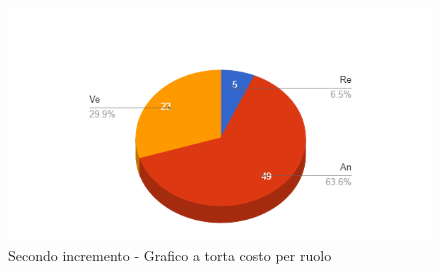 {{\begin{longtable}{C{.4\freewidth} C{.2\freewidth} C{.2\freewidth} C{.2\freewidth} C{.2\freewidth} C{.2\freewidth} C{.2\freewidth} C{.2\freewidth} C{.2\freewidth}}
        \end{longtable}
        \begin{figure}[H]
          \includegraphics[width=15cm]{sezioni/Images/secondoT.png}
          \centering
          \caption{Secondo incremento - Grafico a torta costo per ruolo}
       \end{figure}
    }
    }

